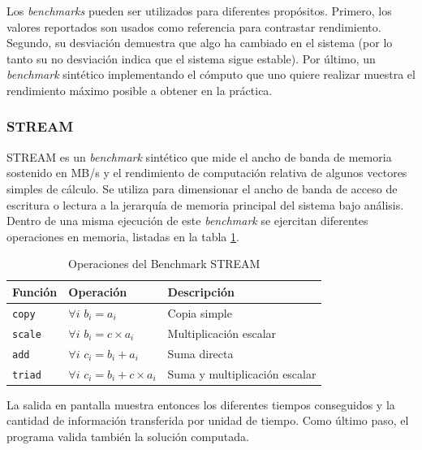 \documentclass[a4paper]{report}
\begin{document}
\bigskip

Los {\it benchmarks} pueden ser utilizados para diferentes propósitos. Primero, los valores reportados son usados como referencia para contrastar rendimiento.
Segundo, su desviación demuestra que algo ha cambiado en el sistema (por lo tanto su no desviación indica que el sistema sigue estable). Por último,
un {\it benchmark} sintético implementando el cómputo que uno quiere realizar muestra el rendimiento máximo posible a obtener en la práctica.

\subsubsection{STREAM}

STREAM \cite{stream} es un {\it benchmark} sintético que mide el ancho de banda de memoria sostenido en MB/s y el rendimiento de computación relativa de algunos vectores simples de cálculo. Se utiliza para dimensionar el ancho de banda de acceso de escritura o lectura a la jerarquía de memoria principal del sistema bajo análisis. Dentro de una misma ejecución de este {\it benchmark} se ejercitan diferentes operaciones en memoria, listadas en la tabla \ref{table:stream}.

\begin{table}[H]
\caption{Operaciones del Benchmark STREAM}
  \centering
    \begin{tabular}{|l|l|l|}\hline
      {\bf Función} & {\bf Operación} & {\bf Descripción} \\ \hline
      {\tt copy} & $ \forall i $ $ b_{i} = a_{i} $ & Copia simple \\ \hline
      {\tt scale} & $ \forall i $ $ b_{i} = c \times a_{i} $ & Multiplicación escalar \\ \hline
      {\tt add} & $ \forall i $ $ c_{i} = b_{i} + a_{i} $ & Suma directa \\ \hline
      {\tt triad} & $ \forall i $ $ c_{i} = b_{i} + c \times a_{i} $ & Suma y multiplicación escalar \\ \hline
    \end{tabular} 
 \label{table:stream}
\end{table}

La salida en pantalla muestra entonces los diferentes tiempos conseguidos y la cantidad de información transferida por unidad de tiempo.
Como último paso, el programa valida también la solución computada.
\end{document}
